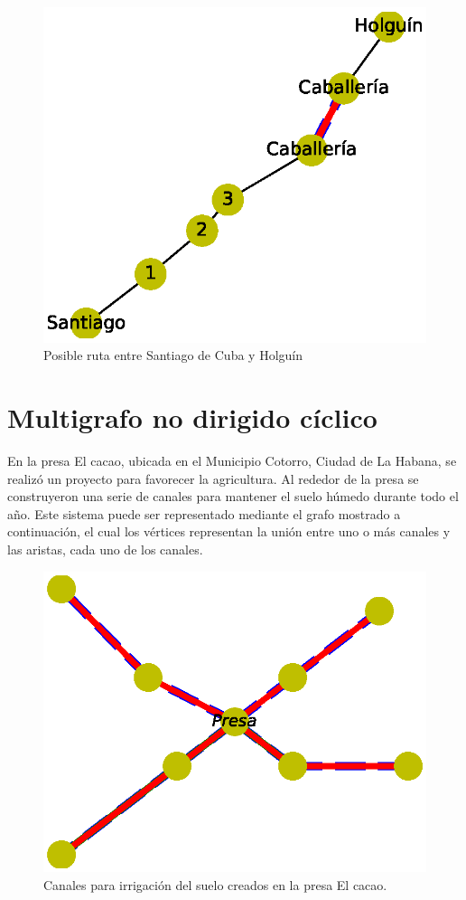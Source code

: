 \documentclass{article}
\begin{document}

\begin{figure}
  \includegraphics[width=.8\columnwidth]{7.eps}
  \caption{Posible ruta entre Santiago de Cuba y Holguín}
  \label{fig:7}
\end{figure}

\section{Multigrafo no dirigido cíclico}

En la presa El cacao, ubicada en el Municipio Cotorro, Ciudad de La Habana, se realizó un proyecto para favorecer la agricultura. Al rededor de la presa se construyeron una serie de canales para mantener el suelo húmedo durante todo el año.
Este sistema puede ser representado mediante el grafo mostrado a continuación, el cual los vértices representan la unión entre uno o más canales y las aristas, cada uno de los canales.



\begin{figure}
  \includegraphics[width=.8\columnwidth]{8.eps}
  \caption{Canales para irrigación del suelo creados en la presa El cacao.}
  \label{fig:8}
\end{figure}
\end{document}
